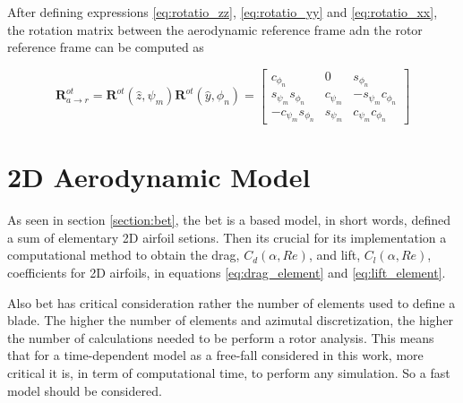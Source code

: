 After defining expressions \ref{eq:rotatio_zz}, \ref{eq:rotatio_yy} and \ref{eq:rotatio_xx}, the rotation matrix between the aerodynamic reference frame adn the rotor reference frame can be computed as

\begin{equation}
    \boldsymbol{R}^{ot}_{a \to r} = \boldsymbol{R}^{ot}(\hat{z}, \psi_m) \boldsymbol{R}^{ot}(\hat{y}, \phi_n) =
    \begin{bmatrix}
    c_{\phi_n} & 0 & s_{\phi_n} \\
    s_{\psi_m}s_{\phi_n} & c_{\psi_m} & -s_{\psi_m}c_{\phi_n} \\
    -c_{\psi_m}s_{\phi_n} & s_{\psi_m} & c_{\psi_m}c_{\phi_n}
    \end{bmatrix}    
    \label{eq:rotatio_aero_rotor}
\end{equation}



\section{2D Aerodynamic Model}
\label{section:aero_model}

As seen in section \ref{section:bet}, the \gls{bet} is a based model, in short words, defined a sum of elementary 2D airfoil setions. Then its crucial for its implementation a computational method to obtain the drag, $C_d (\alpha, Re) $, and  lift, $C_l (\alpha, Re)$, coefficients for 2D airfoils, in equations \ref{eq:drag_element} and \ref{eq:lift_element}.

Also \gls{bet} has critical consideration rather the number of elements used to define a blade. The higher the number of elements and azimutal discretization, the higher the number of calculations needed to be perform a rotor analysis. This means that for a time-dependent model as a free-fall considered in this work, more critical it is, in term of computational time, to perform any simulation. So a fast model should be considered.

